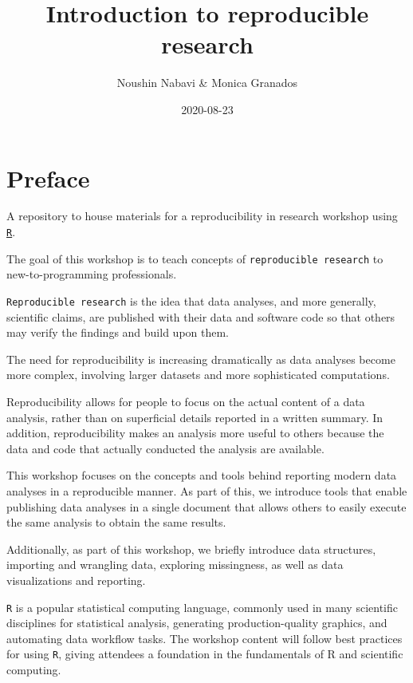 \documentclass[]{book}
\title{Introduction to reproducible research}
\author{Noushin Nabavi \& Monica Granados}
\date{2020-08-23}
\begin{document}
\maketitle

{
\setcounter{tocdepth}{1}
\tableofcontents
}
\hypertarget{preface}{%
\chapter*{Preface}\label{preface}}

A repository to house materials for a reproducibility in research workshop using \href{https://www.r-project.org/}{\texttt{R}}.

The goal of this workshop is to teach concepts of \texttt{reproducible\ research} to new-to-programming professionals.

\texttt{Reproducible\ research} is the idea that data analyses, and more generally, scientific claims, are published with their data and software code so that others may verify the findings and build upon them.

The need for reproducibility is increasing dramatically as data analyses become more complex, involving larger datasets and more sophisticated computations.

Reproducibility allows for people to focus on the actual content of a data analysis, rather than on superficial details reported in a written summary. In addition, reproducibility makes an analysis more useful to others because the data and code that actually conducted the analysis are available.

This workshop focuses on the concepts and tools behind reporting modern data analyses in a reproducible manner. As part of this, we introduce tools that enable publishing data analyses in a single document that allows others to easily execute the same analysis to obtain the same results.

Additionally, as part of this workshop, we briefly introduce data structures, importing and wrangling data, exploring missingness, as well as data visualizations and reporting.

\texttt{R} is a popular statistical computing language, commonly used in many scientific disciplines for statistical analysis, generating production-quality graphics, and automating data workflow tasks. The workshop content will follow best practices for using \texttt{R}, giving attendees a foundation in the fundamentals of R and scientific computing.
\end{document}
